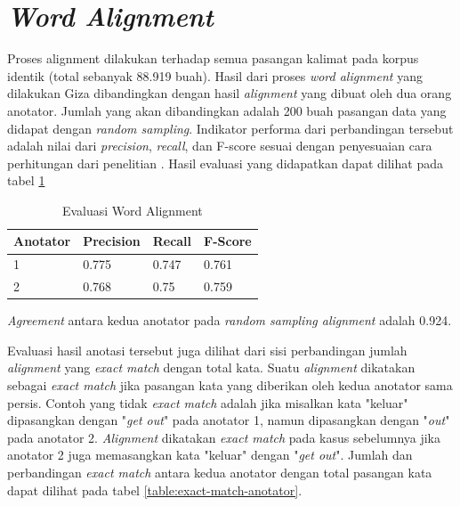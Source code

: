 \section{\textit{Word Alignment}}

Proses alignment dilakukan terhadap semua pasangan kalimat pada korpus identik (total sebanyak 88.919 buah). Hasil dari proses \textit{word alignment} yang dilakukan Giza dibandingkan dengan hasil \textit{alignment} yang dibuat oleh dua orang anotator. Jumlah yang akan dibandingkan adalah 200 buah pasangan data yang didapat dengan \textit{random sampling}. Indikator performa dari perbandingan tersebut adalah nilai dari \textit{precision}, \textit{recall}, dan F-score sesuai dengan penyesuaian cara perhitungan dari penelitian \citep{mihalcea2003evaluation}. Hasil evaluasi yang didapatkan dapat dilihat pada tabel \ref{table:word-alignment-evaluation}

\begin{table}
	\centering
	\caption{Evaluasi Word Alignment}
	\label{table:word-alignment-evaluation}
	\begin{tabular}{|p{2cm}|p{2cm}|p{2cm}|p{2cm}|}
		\hline
		\textbf{Anotator} & \textbf{Precision} & \textbf{Recall} & \textbf{F-Score}
		\\ \hline
		1 & 0.775 & 0.747 & 0.761
		\\ \hline
		2 & 0.768 & 0.75 & 0.759
		\\ \hline
	\end{tabular} 
\end{table}

\textit{Agreement} antara kedua anotator pada \textit{random sampling alignment} adalah 0.924.

Evaluasi hasil anotasi tersebut juga dilihat dari sisi perbandingan jumlah \textit{alignment} yang \textit{exact match} dengan total kata. Suatu \textit{alignment} dikatakan sebagai \textit{exact match} jika pasangan kata yang diberikan oleh kedua anotator sama persis. Contoh yang tidak \textit{exact match} adalah jika misalkan kata "keluar" dipasangkan dengan "\textit{get out}" pada anotator 1, namun dipasangkan dengan "\textit{out}" pada anotator 2. \textit{Alignment} dikatakan \textit{exact match} pada kasus sebelumnya jika anotator 2 juga memasangkan kata "keluar" dengan "\textit{get out}". Jumlah dan perbandingan \textit{exact match} antara kedua anotator dengan total pasangan kata dapat dilihat pada tabel \ref{table:exact-match-anotator}.

